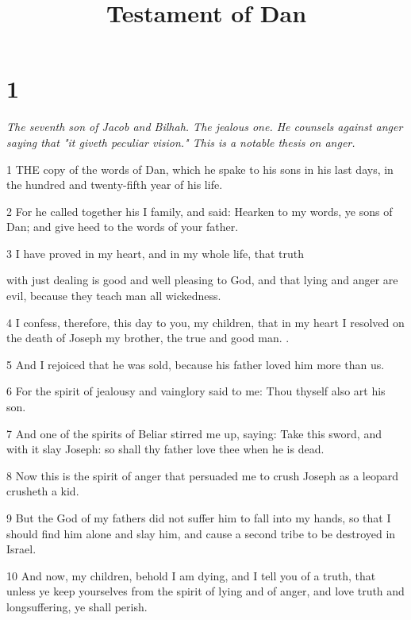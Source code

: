 

\title{Testament of Dan}

\chapter{1}

\par \textit{The seventh son of Jacob and Bilhah. The jealous one. He counsels against anger saying that "it giveth peculiar vision." This is a notable thesis on anger.}

\par 1 THE copy of the words of Dan, which he spake to his sons in his last days, in the hundred and twenty-fifth year of his life.

\par 2 For he called together his I family, and said: Hearken to my words, ye sons of Dan; and give heed to the words of your father.

\par 3 I have proved in my heart, and in my whole life, that truth

with just dealing is good and well pleasing to God, and that lying and anger are evil, because they teach man all wickedness.

\par 4 I confess, therefore, this day to you, my children, that in my heart I resolved on the death of Joseph my brother, the true and good man. .

\par 5 And I rejoiced that he was sold, because his father loved him more than us.

\par 6 For the spirit of jealousy and vainglory said to me: Thou thyself also art his son.

\par 7 And one of the spirits of Beliar stirred me up, saying: Take this sword, and with it slay Joseph: so shall thy father love thee when he is dead.

\par 8 Now this is the spirit of anger that persuaded me to crush Joseph as a leopard crusheth a kid.

\par 9 But the God of my fathers did not suffer him to fall into my hands, so that I should find him alone and slay him, and cause a second tribe to be destroyed in Israel.

\par 10 And now, my children, behold I am dying, and I tell you of a truth, that unless ye keep yourselves from the spirit of lying and of anger, and love truth and longsuffering, ye shall perish.

